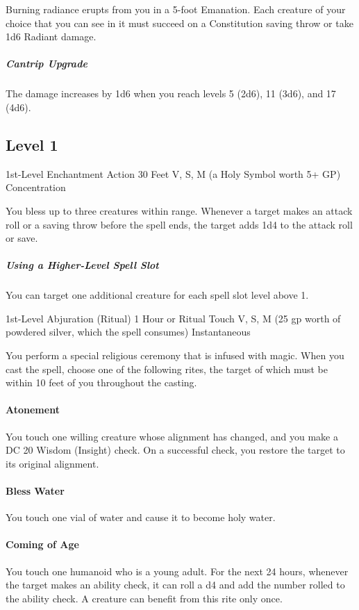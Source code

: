 \documentclass[letterpaper,openany,oneside,twocolumn]{book}
\begin{document}
Burning radiance erupts from you in a 5-foot Emanation. Each creature of your choice that you can see in it must succeed on a Constitution saving throw or take 1d6 Radiant damage.

\subparagraph*{Cantrip Upgrade} The damage increases by 1d6 when you reach levels 5 (2d6), 11 (3d6), and 17 (4d6).

\subsection*{Level 1}
	{1st-Level Enchantment}
	{Action}
	{30 Feet}
	{V, S, M (a Holy Symbol worth 5+ GP)}
	{Concentration}

You bless up to three creatures within range. Whenever a target makes an attack roll or a saving throw before the spell ends, the target adds 1d4 to the attack roll or save.

\subparagraph*{Using a Higher-Level Spell Slot} You can target one additional creature for each spell slot level above 1.

	{1st-Level Abjuration (Ritual)}
	{1 Hour or Ritual}
	{Touch}
	{V, S, M (25 gp worth of powdered silver, which the spell consumes)}
	{Instantaneous}

You perform a special religious ceremony that is infused with magic. When you cast the spell, choose one of the following rites, the target of which must be within 10 feet of you throughout the casting.

\paragraph*{Atonement} You touch one willing creature whose alignment has changed, and you make a DC 20 Wisdom (Insight) check. On a successful check, you restore the target to its original alignment.

\paragraph*{Bless Water} You touch one vial of water and cause it to become holy water.

\paragraph*{Coming of Age} You touch one humanoid who is a young adult. For the next 24 hours, whenever the target makes an ability check, it can roll a d4 and add the number rolled to the ability check. A creature can benefit from this rite only once.
\end{document}
